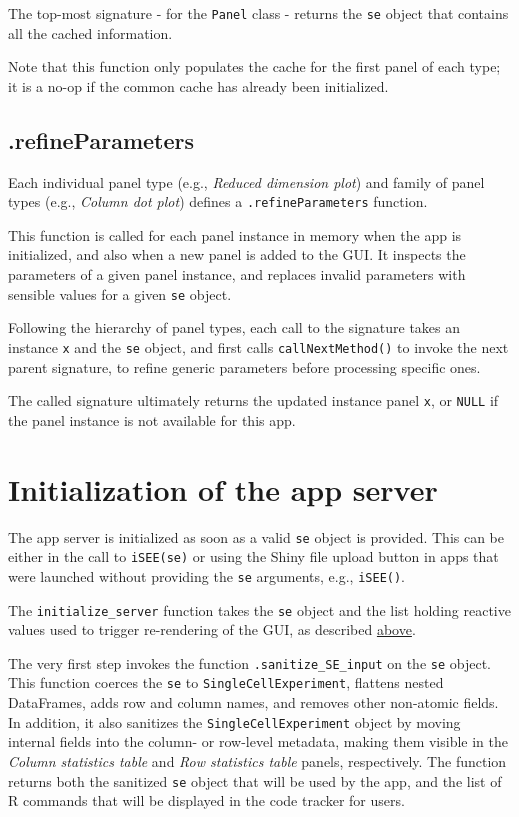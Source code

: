 \documentclass[]{book}
\begin{document}
The top-most signature - for the \texttt{Panel} class - returns the \texttt{se} object that contains all the cached information.

Note that this function only populates the cache for the first panel of each type; it is a no-op if the common cache has already been initialized.

\hypertarget{refineparameters}{%
\subsection{.refineParameters}\label{refineparameters}}

Each individual panel type (e.g., \emph{Reduced dimension plot}) and family of panel types (e.g., \emph{Column dot plot}) defines a \texttt{.refineParameters} function.

This function is called for each panel instance in memory when the app is initialized, and also when a new panel is added to the GUI.
It inspects the parameters of a given panel instance, and replaces invalid parameters with sensible values for a given \texttt{se} object.

Following the hierarchy of panel types, each call to the signature takes an instance \texttt{x} and the \texttt{se} object, and first calls \texttt{callNextMethod()} to invoke the next parent signature, to refine generic parameters before processing specific ones.

The called signature ultimately returns the updated instance panel \texttt{x}, or \texttt{NULL} if the panel instance is not available for this app.

\hypertarget{initialization-of-the-app-server}{%
\section{Initialization of the app server}\label{initialization-of-the-app-server}}

The app server is initialized as soon as a valid \texttt{se} object is provided.
This can be either in the call to \texttt{iSEE(se)} or using the Shiny file upload button in apps that were launched without providing the \texttt{se} arguments, e.g., \texttt{iSEE()}.

The \texttt{initialize\_server} function takes the \texttt{se} object and the list holding reactive values used to trigger re-rendering of the GUI, as described \protect\hyperlink{robjects}{above}.

The very first step invokes the function \texttt{.sanitize\_SE\_input} on the \texttt{se} object.
This function coerces the \texttt{se} to \texttt{SingleCellExperiment}, flattens nested DataFrames, adds row and column names, and removes other non-atomic fields.
In addition, it also sanitizes the \texttt{SingleCellExperiment} object by moving internal fields into the column- or row-level metadata, making them visible in the \emph{Column statistics table} and \emph{Row statistics table} panels, respectively. The function returns both the sanitized \texttt{se} object that will be used by the app, and the list of R commands that will be displayed in the code tracker for users.
\end{document}
